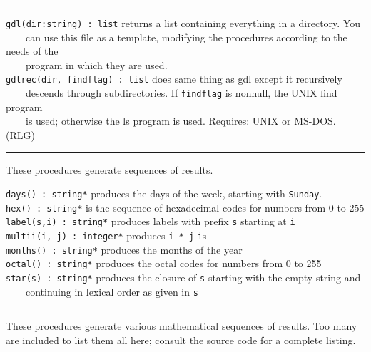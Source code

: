 \vspace{0.25cm}\hrule{}

\texttt{gdl(dir:string) : list} returns a list containing everything in
a directory. You\\
 \ \ \ \ can use this file as a template, modifying the procedures
according to the needs of the\\
 \ \ \ \ program in which they are used.\\
\texttt{gdlrec(dir, findflag) : list} does same thing as gdl except it
recursively\\
 \ \ \ \ descends through subdirectories. If \texttt{findflag} is
nonnull, the UNIX {\textquotedbl}find{\textquotedbl} program\\
 \ \ \ \ is used; otherwise the {\textquotedbl}ls{\textquotedbl} program
is used. Requires: UNIX or MS-DOS. (RLG)

\vspace{0.25cm}\hrule{}

These procedures generate sequences of results. 

\texttt{days() : string*} produces the days of
the week, starting with
\texttt{{\textquotedbl}Sunday{\textquotedbl}}.\\
\texttt{hex() : string*} is the sequence of
hexadecimal codes for numbers from 0 to 255\\
\texttt{label(s,i) : string*} produces labels with prefix \texttt{s}
starting at \texttt{i}\\
\texttt{multii(i, j) : integer*} produces \texttt{i * j}
\texttt{i}{\textquotesingle}s\\
\texttt{months() : string*} produces the months of the year\\
\texttt{octal() : string*} produces the octal codes for
numbers from 0 to 255\\
\texttt{star(s) : string*} produces the closure of \texttt{s} starting with the
empty string and\\
 \ \ \ \ continuing in lexical order as given in \texttt{s} 

\vspace{0.25cm}\hrule{}

These procedures generate various mathematical
sequences of results. Too many are included to list
them all here; consult the source code for a complete listing.

